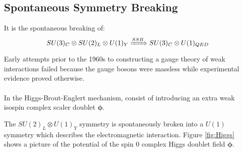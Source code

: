 \subsection{Spontaneous Symmetry Breaking}
It is the spontaneous breaking of:
\begin{equation}
 SU(3)_{C} \otimes SU(2)_{L} \otimes U(1)_{Y} \xRightarrow{SSB} SU(3)_C \otimes U(1)_{QED}
\end{equation}
Early attempts prior to the 1960s to constructing a gauge theory of weak interactions failed because the gauge bosons were massless while experimental evidence proved otherwise.
\paragraph*{}
In the Higgs-Brout-Englert \cite{HIGGS} mechanism, consist of introducing an extra weak isospin complex scaler doublet $\mathbf{\phi}$.


The  $SU(2)_{L} \otimes U(1)_{Y}$ symmetry is spontaneously broken into a $U(1)$ symmetry  which describes the electromagnetic interaction. Figure \ref{fig:Higgs} shows a picture of the potential of the spin $0$ complex Higgs doublet field $\mathbf{\phi}$.

